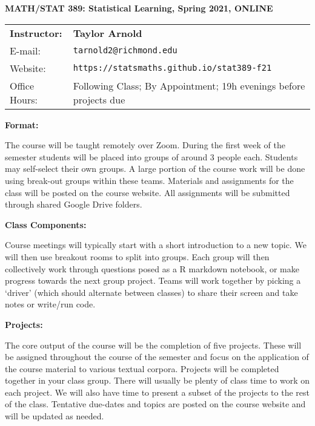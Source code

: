 \documentclass[12pt, a4paper]{article}
\begin{document}
\begin{center}
\textbf{MATH/STAT 389: Statistical Learning, Spring 2021, ONLINE}
\end{center}

\noindent
\begin{tabular}{ l l }
\textbf{Instructor:} &  \textbf{Taylor Arnold} \\
E-mail: & \texttt{tarnold2@richmond.edu} \\
Website: & \texttt{https://statsmaths.github.io/stat389-f21} \\
Office Hours: & Following Class; By Appointment; 19h evenings before projects due
\end{tabular}

\vspace{0.5cm}

\textbf{Format:} \vspace{6pt}

The course will be taught remotely over Zoom. During the first week of the
semester students will be placed into groups of around 3 people each. Students
may self-select their own groups. A large portion of the course work will be
done using break-out groups within these teams. Materials and assignments for
the class will be posted on the course website. All assignments will be
submitted through shared Google Drive folders.

\vspace{12pt}

\textbf{Class Components:} \vspace{6pt}

Course meetings will typically start with a short introduction to a new topic.
We will then use breakout rooms to split into groups. Each group will then
collectively work through questions posed as a R markdown notebook, or make
progress towards the next group project. Teams will work together by picking a
`driver' (which should alternate between classes) to share their screen and
take notes or write/run code.

\vspace{12pt}

\textbf{Projects:} \vspace{6pt}

The core output of the course will be the completion of five projects. These
will be assigned throughout the course of the semester and focus on the
application of the course material to various textual corpora. Projects will
be completed together in your class group. There will usually be plenty of
class time to work on each project. We will also have time to present a subset
of the projects to the rest of the class. Tentative due-dates and topics are
posted on the course website and will be updated as needed.
\end{document}
